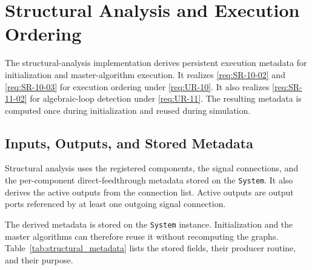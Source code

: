 \section{Structural Analysis and Execution Ordering}
\label{sec:impl_structural}

The structural-analysis implementation derives persistent execution metadata for initialization and master-algorithm execution.
It realizes \ref{req:SR-10-02} and \ref{req:SR-10-03} for execution ordering under \ref{req:UR-10}.
It also realizes \ref{req:SR-11-02} for algebraic-loop detection under \ref{req:UR-11}.
The resulting metadata is computed once during initialization and reused during simulation.

\subsection{Inputs, Outputs, and Stored Metadata}
\label{sec:impl_structural_inputs}

Structural analysis uses the registered components, the signal connections, and the per-component direct-feedthrough metadata stored on the \texttt{System}.
It also derives the active outputs from the connection list.
Active outputs are output ports referenced by at least one outgoing signal connection.

The derived metadata is stored on the \texttt{System} instance.
Initialization and the master algorithms can therefore reuse it without recomputing the graphs.
Table~\ref{tab:structural_metadata} lists the stored fields, their producer routine, and their purpose.

